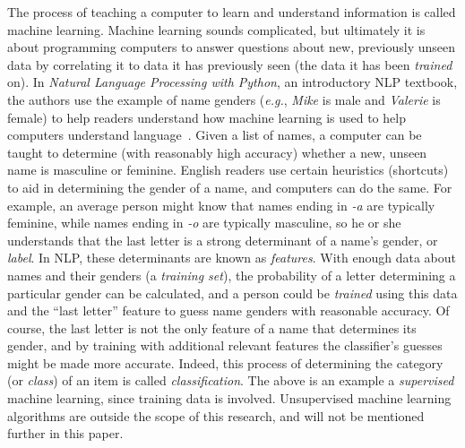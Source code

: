 The process of teaching a computer to learn and understand information is called machine learning.
Machine learning sounds complicated, but ultimately it is about programming computers to answer questions about new, previously unseen data by correlating it to data it has previously seen (the data it has been {\it trained} on).
In {\it Natural Language Processing with Python}, an introductory NLP textbook, the authors use the example of name genders ({\it e.g.}, {\it Mike} is male and {\it Valerie} is female) to help readers understand how machine learning is used to help computers understand language~\cite{nlpwp}.
Given a list of names, a computer can be taught to determine (with reasonably high accuracy) whether a new, unseen name is masculine or feminine.
English readers use certain heuristics (shortcuts) to aid in determining the gender of a name, and computers can do the same.
For example, an average person might know that names ending in {\it -a} are typically feminine, while names ending in {\it -o} are typically masculine, so he or she understands that the last letter is a strong determinant of a name's gender, or {\it label}.
In NLP, these determinants are known as {\it features}.
With enough data about names and their genders (a {\it training set}), the probability of a letter determining a particular gender can be calculated, and a person could be {\it trained} using this data and the ``last letter'' feature to guess name genders with reasonable accuracy.
Of course, the last letter is not the only feature of a name that determines its gender, and by training with additional relevant features the classifier's guesses might be made more accurate.
Indeed, this process of determining the category (or {\it class}) of an item is called {\it classification}.
The above is an example a {\it supervised} machine learning, since training data is involved.
Unsupervised machine learning algorithms are outside the scope of this research, and will not be mentioned further in this paper.

